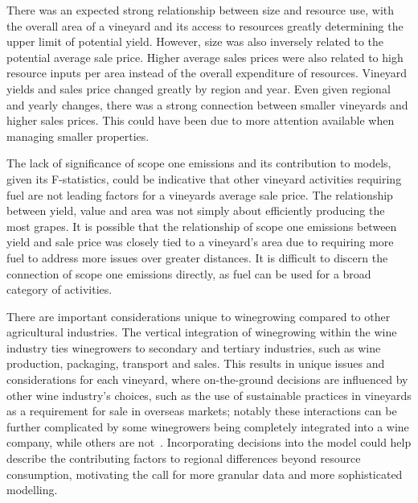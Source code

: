 \documentclass[10pt,letterpaper]{article}
\begin{document}
There was an expected strong relationship between size and resource use, with the overall area of a vineyard and its access to resources greatly determining the upper limit of potential yield. However, size was also inversely related to the potential average sale price. Higher average sales prices were also related to high resource inputs per area instead of the overall expenditure of resources. Vineyard yields and sales price changed greatly by region and year. Even given regional and yearly changes, there was a strong connection between smaller vineyards and higher sales prices. This could have been due to more attention available when managing smaller properties.
\par
The lack of significance of scope one emissions and its contribution to models, given its F-statistics, could be indicative that other vineyard activities requiring fuel are not leading factors for a vineyards average sale price. The relationship between yield, value and area was not simply about efficiently producing the most grapes. It is possible that the relationship of scope one emissions between yield and sale price was closely tied to a vineyard's area due to requiring more fuel to address more issues over greater distances. It is difficult to discern the connection of scope one emissions directly, as fuel can be used for a broad category of activities. 
\par
There are important considerations unique to winegrowing compared to other agricultural industries. The vertical integration of winegrowing within the wine industry ties winegrowers to secondary and tertiary industries, such as wine production, packaging, transport and sales. This results in unique issues and considerations for each vineyard, where on-the-ground decisions are influenced by other wine industry's choices, such as the use of sustainable practices in vineyards as a requirement for sale in overseas markets; notably these interactions can be further complicated by some winegrowers being completely integrated into a wine company, while others are not~\cite{knightFirmResourcesDevelopment2019}. Incorporating decisions into the model could help describe the contributing factors to regional differences beyond resource consumption, motivating the call for more granular data and more sophisticated modelling.
\par
\end{document}
